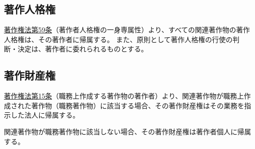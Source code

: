 

\subsection{著作人格権}
\href{https://elaws.e-gov.go.jp/document?lawid=345AC0000000048\#Mp-At_59}{著作権法第59条}（著作者人格権の一身専属性）\cite{eGovCopyrightLaw}より、すべての関連著作物の著作人格権は、その著作者に帰属する。
また、原則として著作人格権の行使の判断・決定は、著作者に委れられるものとする。


\subsection{著作財産権}
\href{https://elaws.e-gov.go.jp/document?lawid=345AC0000000048#Mp-At_15}{著作権法第15条}（職務上作成する著作物の著作者）\cite{eGovCopyrightLaw}より、関連著作物が職務上作成された著作物（職務著作物）に該当する場合、その著作財産権はその業務を指示した法人に帰属する。

関連著作物が職務著作物に該当しない場合、その著作財産権は著作者個人に帰属する。




